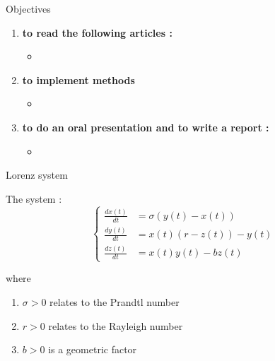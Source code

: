 \documentclass[10pt,xcolor={table,dvipsnames},t]{beamer}
\begin{document}
	\begin{frame}{Objectives}
		
		\begin{enumerate}[\textbullet]
			\item \textbf{to read the following articles :}
			\begin{itemize}
				\item 
			\end{itemize}
			\item \textbf{to implement methods} 
			\begin{itemize}
				\item 
			\end{itemize}
			\item \textbf{to do an oral presentation and to write a report :}
			\begin{itemize}
				\item
			\end{itemize}
		\end{enumerate}
	
	\end{frame}
	
	\begin{frame}{Lorenz system}
		
		The system :
		$$\left\{\begin{aligned} 
			\frac{d x(t)}{d t} &=\sigma(y(t)-x(t))\\
			\frac{d y(t)}{d t}&=x(t)(r-z(t))-y(t) \\
			\frac{d z(t)}{d t}&=x(t)y(t)-bz(t)
		\end{aligned}\right.$$
	
		where
		
		\begin{enumerate}[\textbullet]
			\item $\sigma > 0$  relates to the Prandtl number
			\item $r > 0$  relates to the Rayleigh number
			\item $b > 0$ is a geometric factor
		\end{enumerate}
		
	\end{frame}
\end{document}
